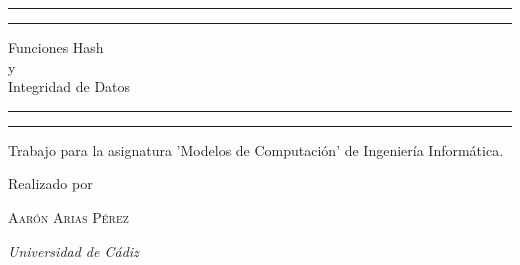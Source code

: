 \documentclass[a4paper, 12pt]{article} %
\begin{document}
\newpage
\begin{titlepage}

	\centering %

	\scshape %

	\vspace*{\baselineskip} %


	\rule{\textwidth}{1.6pt}\vspace*{-\baselineskip}\vspace*{2pt} %
	\rule{\textwidth}{0.4pt} %

	\vspace{0.75\baselineskip} %

	{\LARGE Funciones Hash\\y\\Integridad de Datos\\} %

	\vspace{0.75\baselineskip} %

	\rule{\textwidth}{0.4pt}\vspace*{-\baselineskip}\vspace{3.2pt} %
	\rule{\textwidth}{1.6pt} %

	\vspace{2\baselineskip} %


	Trabajo para la asignatura 'Modelos de Computación' de Ingeniería Informática.

	\vspace*{3\baselineskip} %


	Realizado por

	\vspace{0.5\baselineskip} %

	{\scshape\Large Aarón Arias Pérez\\} %

	\vspace{0.5\baselineskip} %

	\textit{Universidad de Cádiz} %

\end{titlepage}
\end{document}
